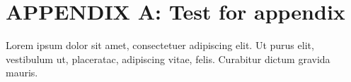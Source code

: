 \newcommand{\hbAppendixPrefix}{A}
\renewcommand{\thefigure}{\hbAppendixPrefix.\arabic{figure}}
\setcounter{figure}{0}
\renewcommand{\thetable}{\hbAppendixPrefix.\arabic{table}} 
\setcounter{table}{0}

\section{APPENDIX \hbAppendixPrefix: Test for appendix}

Lorem ipsum dolor sit amet, consectetuer adipiscing elit.  Ut purus elit, vestibulum ut, placeratac,  adipiscing vitae,  felis.   Curabitur dictum gravida mauris.  
